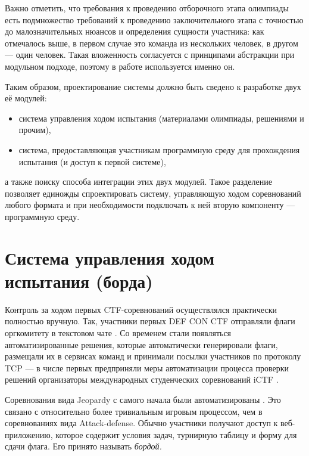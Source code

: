 
Важно отметить, что требования к проведению отборочного этапа олимпиады есть подмножество требований к проведению заключительного этапа с точностью до малозначительных нюансов и определения сущности участника: как отмечалось выше, в первом случае это команда из нескольких человек, в другом — один человек. Такая вложенность согласуется с принципами абстракции при модульном подходе, поэтому в работе используется именно он.

Таким образом, проектирование системы должно быть сведено к разработке двух её модулей:
\begin{itemize}
\item система управления ходом испытания (материалами олимпиады, решениями и прочим),
\item система, предоставляющая участникам программную среду для прохождения испытания (и доступ к первой системе),
\end{itemize}
а также поиску способа интеграции этих двух модулей. Такое разделение позволяет единожды спроектировать систему, управляющую ходом соревнований любого формата и при необходимости подключать к ней вторую компоненту — программную среду.


\section{Система управления ходом испытания (борда)}

Контроль за ходом первых CTF-соревнований осуществлялся практически полностью вручную. Так, участники первых DEF CON CTF отправляли флаги оргкомитету в текстовом чате \cite{defcon}. Со временем стали появляться автоматизированные решения, которые автоматически генерировали флаги, размещали их в сервисах команд и принимали посылки участников по протоколу TCP — в числе первых предприняли меры автоматизации процесса проверки решений организаторы международных студенческих соревнований iCTF \cite{vigna2014:ictf}.


Соревнования вида Jeopardy с самого начала были автоматизированы \cite{Kolegov08}. Это связано с относительно более тривиальным игровым процессом, чем в соревнованиях вида Attack-defense. Обычно участники получают доступ к веб-приложению, которое содержит условия задач, турнирную таблицу и форму для сдачи флага. Его принято называть \textit{бордой.}


